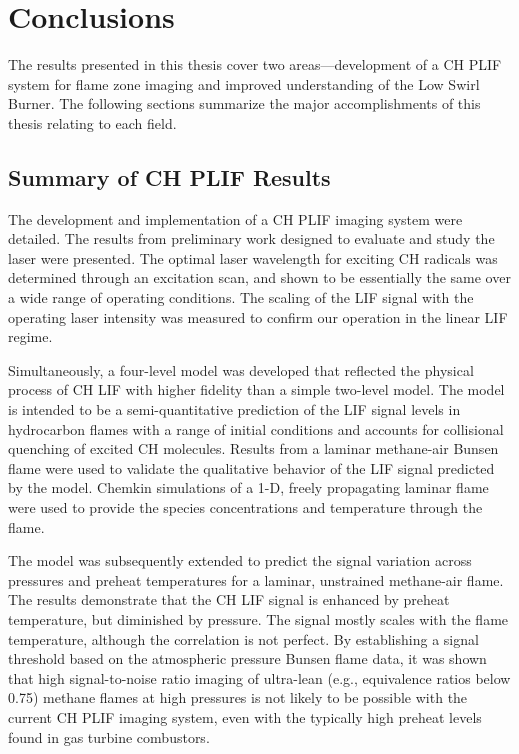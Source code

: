 \chapter{Conclusions}
\label{ch:conclusions}

The results presented in this thesis cover two areas---development of a CH PLIF system for flame zone imaging and improved understanding of the Low Swirl Burner.
The following sections summarize the major accomplishments of this thesis relating to each field.

\section{Summary of CH PLIF Results}

The development and implementation of a CH PLIF imaging system were detailed.
The results from preliminary work designed to evaluate and study the laser were presented.
The optimal laser wavelength for exciting CH radicals was determined through an excitation scan, and shown to be essentially the same over a wide range of operating conditions.
The scaling of the LIF signal with the operating laser intensity was measured to confirm our operation in the linear LIF regime.

Simultaneously, a four-level model was developed that reflected the physical process of CH LIF with higher fidelity than a simple two-level model.
The model is intended to be a semi-quantitative prediction of the LIF signal levels in hydrocarbon flames with a range of initial conditions and accounts for collisional quenching of excited CH molecules.
Results from a laminar methane-air Bunsen flame were used to validate the qualitative behavior of the LIF signal predicted by the model.
Chemkin simulations of a 1-D, freely propagating laminar flame were used to provide the species concentrations and temperature through the flame.

The model was subsequently extended to predict the signal variation across pressures and preheat temperatures for a laminar, unstrained methane-air flame.
The results demonstrate that the CH LIF signal is enhanced by preheat temperature, but diminished by pressure.
The signal mostly scales with the flame temperature, although the correlation is not perfect.
By establishing a signal threshold based on the atmospheric pressure Bunsen flame data, it was shown that high signal-to-noise ratio imaging of ultra-lean (e.g., equivalence ratios below 0.75) methane flames at high pressures is not likely to be possible with the current CH PLIF imaging system, even with the typically high preheat levels found in gas turbine combustors.

